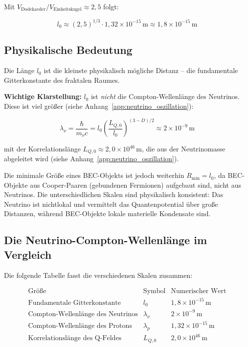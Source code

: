 Mit \( V_{\text{Dodekaeder}} / V_{\text{Einheitskugel}} \approx 2,5 \) folgt:

\[
l_0 \approx (2,5)^{1/3} \cdot 1,32 \times 10^{-15} \, \text{m} \approx 1,8 \times 10^{-15} \, \text{m} \tag{K.2}
\]

\subsection{Physikalische Bedeutung}
\label{sub:bec_l0_bedeutung}

Die Länge \( l_0 \) ist die kleinste physikalisch mögliche Distanz – die fundamentale Gitterkonstante des fraktalen Raumes.

\textbf{Wichtige Klarstellung:} \( l_0 \) ist \emph{nicht} die Compton-Wellenlänge des Neutrinos. Diese ist viel größer (siehe Anhang~\ref{app:neutrino_oszillation}):

\[
\lambda_\nu = \frac{\hbar}{m_\nu c} = l_0 \left( \frac{L_{Q,0}}{l_0} \right)^{(3-D)/2} \approx 2 \times 10^{-9} \, \text{m} \tag{K.3}
\]

mit der Korrelationslänge \( L_{Q,0} \approx 2{,}0 \times 10^{46} \, \text{m} \), die aus der Neutrinomasse abgeleitet wird (siehe Anhang~\ref{app:neutrino_oszillation}).

Die minimale Größe eines BEC-Objekts ist jedoch weiterhin \( R_{\min} = l_0 \), da BEC-Objekte aus Cooper-Paaren (gebundenen Fermionen) aufgebaut sind, nicht aus Neutrinos. Die unterschiedlichen Skalen sind physikalisch konsistent: Das Neutrino ist nichtlokal und vermittelt das Quantenpotential über große Distanzen, während BEC-Objekte lokale materielle Kondensate sind.

\subsection{Die Neutrino-Compton-Wellenlänge im Vergleich}
\label{sub:bec_l0_compton_vergleich}

Die folgende Tabelle fasst die verschiedenen Skalen zusammen:

\[
\begin{array}{l|c|c}
\text{Größe} & \text{Symbol} & \text{Numerischer Wert} \\
\hline
\text{Fundamentale Gitterkonstante} & l_0 & 1,8 \times 10^{-15} \, \text{m} \\
\text{Compton-Wellenlänge des Neutrinos} & \lambda_\nu & 2 \times 10^{-9} \, \text{m} \\
\text{Compton-Wellenlänge des Protons} & \lambda_p & 1,32 \times 10^{-15} \, \text{m} \\
\text{Korrelationslänge des Q-Feldes} & L_{Q,0} & 2{,}0 \times 10^{46} \, \text{m}
\end{array} \tag{K.4}
\]

